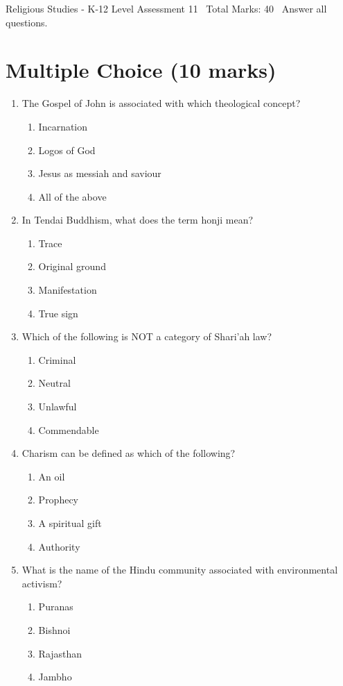 \documentclass[12pt]{article}
\begin{document}
\begin{center}
Religious Studies - K-12 Level Assessment 11 \
Total Marks: 40 \
Answer all questions.
\end{center}

\section*{Multiple Choice (10 marks)}
\begin{enumerate}[label=\arabic*.]
\item The Gospel of John is associated with which theological concept?
\begin{enumerate}[label=(\alph*)]
    \item Incarnation
    \item Logos of God
    \item Jesus as messiah and saviour
    \item All of the above
\end{enumerate}
\item In Tendai Buddhism, what does the term honji mean?
\begin{enumerate}[label=(\alph*)]
    \item Trace
    \item Original ground
    \item Manifestation
    \item True sign
\end{enumerate}
\item Which of the following is NOT a category of Shari'ah law?
\begin{enumerate}[label=(\alph*)]
    \item Criminal
    \item Neutral
    \item Unlawful
    \item Commendable
\end{enumerate}
\item Charism can be defined as which of the following?
\begin{enumerate}[label=(\alph*)]
    \item An oil
    \item Prophecy
    \item A spiritual gift
    \item Authority
\end{enumerate}
\item What is the name of the Hindu community associated with environmental activism?
\begin{enumerate}[label=(\alph*)]
    \item Puranas
    \item Bishnoi
    \item Rajasthan
    \item Jambho
\end{enumerate}
\end{enumerate}
\end{document}
